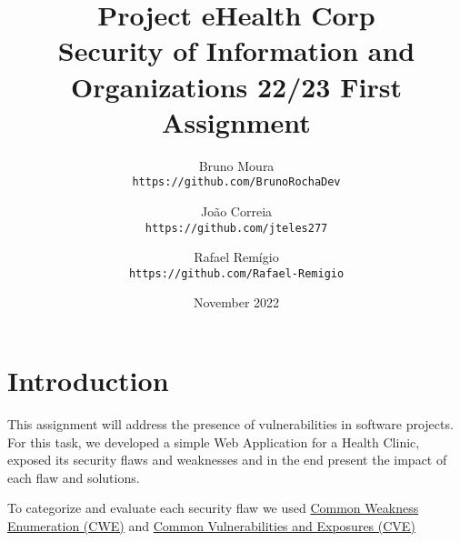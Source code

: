 \documentclass[12pt, letterpaper]{report}
\title{%
  Project eHealth Corp \\
  \large Security of Information and Organizations 22/23 First Assignment}
\author{

  Bruno Moura\\
  \texttt{https://github.com/BrunoRochaDev}
  \and
  João Correia\\
  \texttt{https://github.com/jteles277}
  \and
  Rafael Remígio\\
  \texttt{https://github.com/Rafael-Remigio}
  
}
\date{November 2022}
\begin{document}
	\maketitle
	
	\tableofcontents

	\chapter{Introduction}
	
	\par This assignment will address the presence of vulnerabilities in software projects. For this task, we developed a simple Web Application for a Health Clinic, exposed its security flaws and weaknesses and in the end present the impact of each flaw and solutions.
	\par
To categorize and evaluate each security flaw we used \href{https://cwe.mitre.org/}{Common Weakness Enumeration (CWE)} and \href{https://cve.mitre.org/}{Common Vulnerabilities and Exposures (CVE)}
	
\end{document}
